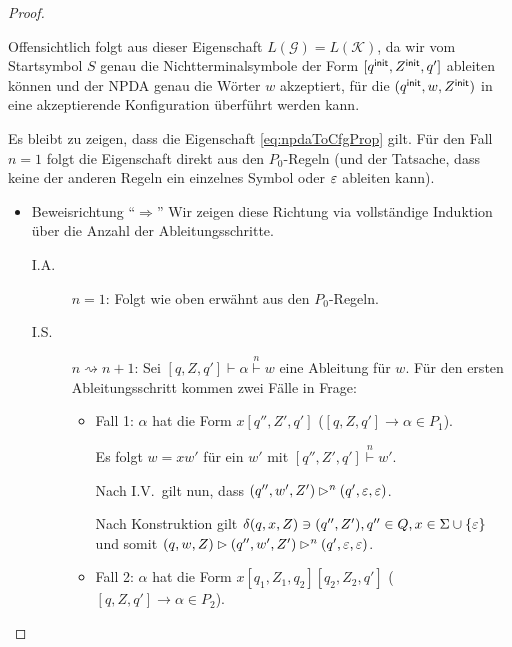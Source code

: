 \begin{proof}
\begin{center}
    \end{center}
    
    Offensichtlich folgt aus dieser Eigenschaft $L(\mathcal{G}) = L(\mathcal{K})$, da wir vom Startsymbol $S$ genau die Nichtterminalsymbole der Form
    $[q^\mathsf{init}, Z^\mathsf{init}, q']$ ableiten können und der \ac{NPDA} genau die Wörter $w$ akzeptiert, für die  $(q^\mathsf{init}, w, Z^\mathsf{init})$ in eine akzeptierende Konfiguration überführt werden kann.
    
    Es bleibt zu zeigen, dass die Eigenschaft \eqref{eq:npdaToCfgProp} gilt.
    Für den Fall $n=1$ folgt die Eigenschaft direkt aus den $P_0$-Regeln (und der Tatsache, dass keine der anderen Regeln ein einzelnes Symbol oder $\varepsilon$ ableiten kann).
    
    \begin{itemize}
     \item Beweisrichtung "`$\Rightarrow$"'
     Wir zeigen diese Richtung via vollständige Induktion über die Anzahl der Ableitungsschritte.
     \begin{description}
      \item[I.A.] $n=1$: Folgt wie oben erwähnt aus den $P_0$-Regeln.
      \item[I.S.] $n\rightsquigarrow n+1$:
      Sei $[q,Z,q']\vdash\alpha\stackrel{n}{\vdash} w$ eine Ableitung für $w$. Für den ersten Ableitungsschritt kommen zwei Fälle in Frage:
      \begin{itemize}
      \item Fall 1: $\alpha$ hat die Form $x[q'', Z', q']$ ($[q,Z,q']\rightarrow\alpha \in P_1$).
      
	  Es folgt $w = xw'$ für ein $w'$ mit $[q'', Z', q']\stackrel{n}{\vdash} w'$.
	  
	  Nach I.V.\ gilt nun, dass $(q'', w', Z') \rhd^n (q',\varepsilon,\varepsilon)$.
	  
	  Nach Konstruktion gilt $\delta(q, x, Z) \ni (q'', Z'), q'' \in Q, x \in \Sigma \cup \{\varepsilon\}$ und somit
	  $(q, w, Z) \rhd (q'', w', Z') \rhd^n (q',\varepsilon,\varepsilon)$.
      \item Fall 2: $\alpha$ hat die Form $x[q_1,Z_1,q_2][q_2, Z_2, q']$ ($[q,Z,q']\rightarrow\alpha \in P_2$).
      

\end{itemize}
\end{description}
\end{itemize}
\end{proof}
